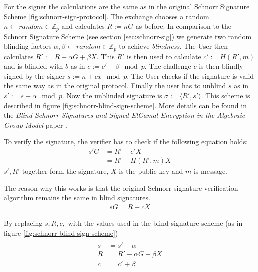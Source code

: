 For the signer the calculations are the same as in the original Schnorr Signature Scheme \ref{fig:schnorr-sign-protocol}.
The exchange chooses a random $n \leftarrow random \in \mathbb{Z}_p$ and calculates $R := nG$ as before.
In comparison to the Schnorr Signature Scheme (see section \ref{sec:schnorr-sig}) we generate two random blinding factors $\alpha, \beta \leftarrow random \in \mathbb{Z}_p$ to achieve \textit{blindness}.
The User then calculates $R' := R + \alpha G + \beta X$.
This $R'$ is then used to calculate $c' := H(R',m)$ and is blinded with $b$ as in $c := c' + \beta \mod p$.
The challenge $c$ is then blindly signed by the signer $s := n+cx \mod p$.
The User checks if the signature is valid the same way as in the original protocol.
Finally the user has to unblind $s$ as in $s' := s + \alpha \mod p$.
Now the unblinded signature is $\sigma := \langle R',s' \rangle$.
This scheme is described in figure \ref{fig:schnorr-blind-sign-scheme}.
More details can be found in the \textit{Blind Schnorr Signatures and Signed ElGamal Encryption in the Algebraic Group Model} paper \cite{cryptoeprint:2019:877}.


To verify the signature, the verifier has to check if the following equation holds:
\begin{align*}
    s'G & = R' + c' X
    \\ &= R' + H(R', m) X
\end{align*}
$ s', R' $ together form the signature, $ X $ is the public key and $ m $ is message.

The reason why this works is that the original Schnorr signature verification algorithm remains the same in blind signatures.
\begin{align*}
    sG = R + c X
\end{align*}

By replacing $ s, R, c, $ with the values used in the blind signature scheme (as in figure \ref{fig:schnorr-blind-sign-scheme})
\begin{align*}
    \\ s &= s' - \alpha
    \\ R &= R' - \alpha G - \beta X
    \\ c &= c' + \beta
\end{align*}

